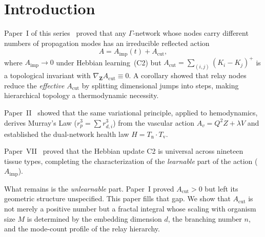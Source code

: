 \documentclass[aps,pre,twocolumn,superscriptaddress,longbibliography]{revtex4-2}
\newcommand{\Acut}{A_{\text{cut}}}
\newcommand{\Aimp}{A_{\text{imp}}}
\newcommand{\Tv}{T_{\text{v}}}
\newcommand{\Tn}{T_{\text{n}}}
\begin{document}
\begin{abstract}
The dual-network organism is not \mbox{``$1 + 1 = 2$''}
networks in parallel.
It is \mbox{``$1 \times 1 = \Omega$''}: two topologically
one-dimensional trees, each carrying fractal overhead from
space-filling in three dimensions, interlocked in a shared
volume at irreducible cost.

\medskip\noindent
\textbf{Circularity disclosure.}
The $\Acut$ scaling law is a mathematical consequence of
Paper~I's theorem plus geometric constraints; no
simulation or fitted parameters are involved.
Metabolic data are from published allometry literature.
\end{abstract}

\maketitle


\section{Introduction}
\label{sec:intro}

Paper~I of this series~\cite{PaperI} proved that any
$\Gamma$-network whose nodes carry different numbers of
propagation modes has an irreducible reflected action
\begin{equation}
  A = \Aimp(t) + \Acut,
  \label{eq:decomp}
\end{equation}
where $\Aimp \to 0$ under Hebbian learning~(C2) but
$\Acut = \sum_{(i,j)} (K_i - K_j)^+$ is a topological
invariant with $\nabla_{\mathbf{Z}} \Acut \equiv 0$.
A corollary showed that relay nodes reduce the
\emph{effective} $\Acut$ by splitting dimensional
jumps into steps, making hierarchical topology a
thermodynamic necessity.

Paper~II~\cite{PaperII} showed that the same variational
principle, applied to hemodynamics, derives Murray's Law
($r_p^3 = \sum r_{d,i}^3$) from the vascular action
$A_v = Q^2 Z + \lambda V$ and established the
dual-network health law $H = \Tn \cdot \Tv$.

Paper~VII~\cite{PaperVII} proved that the Hebbian update
C2 is universal across nineteen tissue types, completing
the characterization of the \emph{learnable} part of the
action ($\Aimp$).

What remains is the \emph{unlearnable} part.
Paper~I proved $\Acut > 0$ but left its geometric
structure unspecified.
This paper fills that gap.
We show that $\Acut$ is not merely a positive number
but a fractal integral whose scaling with organism
size $M$ is determined by the embedding dimension $d$,
the branching number $n$, and the mode-count profile
of the relay hierarchy.
\end{document}
